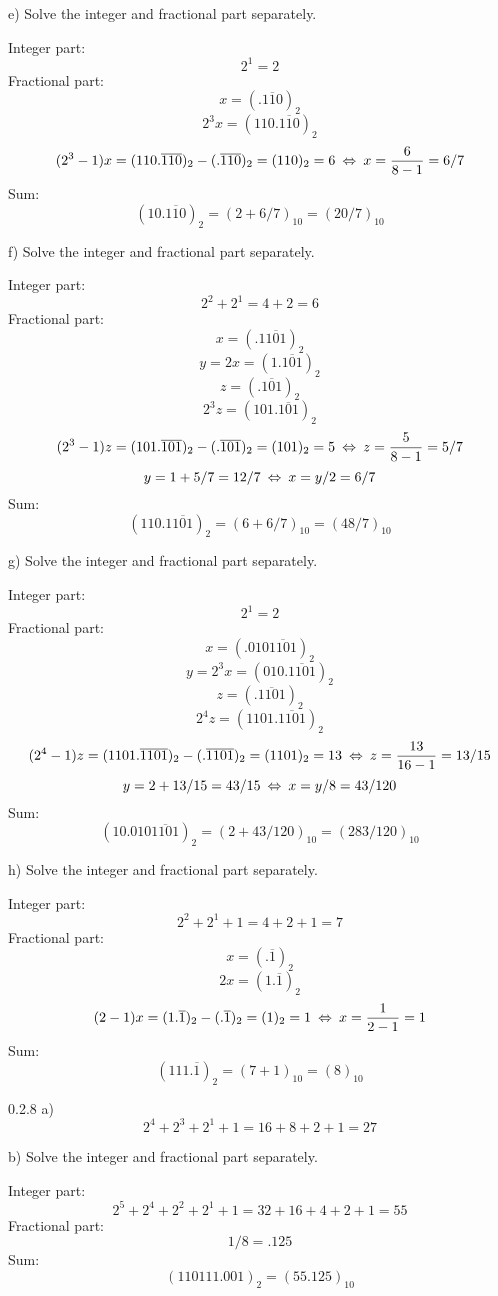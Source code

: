 \begin{task}{e)}
Solve the integer and fractional part separately.

Integer part:
\[2^1=2\]
Fractional part:
\[x=(.\overline{110})_2\]
\[2^3x=(110.\overline{110})_2\]
\[(2^3-1)x=(110.\overline{110})_2-(.\overline{110})_2=(110)_2=6\lra 
x= \dfrac{6}{8-1}=6/7\]
Sum:
\[(10.\overline{110})_2=(2+6/7)_{10}=(20/7)_{10}\]
\end{task}

\begin{task}{f)}
Solve the integer and fractional part separately.

Integer part:
\[2^2+2^1=4+2=6\]
Fractional part:
\[x=(.1\overline{101})_2\]
\[y=2x=(1.\overline{101})_2\]
\[z=(.\overline{101})_2\]
\[2^3z=(101.\overline{101})_2\]
\[(2^3-1)z=(101.\overline{101})_2-(.\overline{101})_2=(101)_2=5\lra 
z= \dfrac{5}{8-1}=5/7\]
\[y=1+5/7=12/7\lra x = y/2 = 6/7\]
Sum:
\[(110.1\overline{101})_2=(6+6/7)_{10}=(48/7)_{10}\]
\end{task}

\begin{task}{g)}
Solve the integer and fractional part separately.

Integer part:
\[2^1=2\]
Fractional part:
\[x=(.010\overline{1101})_2\]
\[y=2^3x=(010.\overline{1101})_2\]
\[z=(.\overline{1101})_2\]
\[2^4z=(1101.\overline{1101})_2\]
\[(2^4-1)z=(1101.\overline{1101})_2-(.\overline{1101})_2=(1101)_2=13\lra 
z= \dfrac{13}{16-1}=13/15\]
\[y=2+13/15=43/15\lra x = y/8 = 43/120\]
Sum:
\[(10.010\overline{1101})_2=(2+43/120)_{10}=(283/120)_{10}\]
\end{task}

\begin{task}{h)}
Solve the integer and fractional part separately.

Integer part:
\[2^2+2^1+1=4+2+1=7\]
Fractional part:
\[x=(.\overline{1})_2\]
\[2x=(1.\overline{1})_2\]
\[(2-1)x=(1.\overline{1})_2-(.\overline{1})_2=(1)_2=1\lra 
x= \dfrac{1}{2-1}=1\]
Sum:
\[(111.\overline{1})_2=(7+1)_{10}=(8)_{10}\]
\end{task}

\begin{task}{0.2.8 a)}
\[2^4+2^3+2^1+1=16+8+2+1=27\]
\end{task}

\begin{task}{b)}
Solve the integer and fractional part separately.

Integer part:
\[2^5+2^4+2^2+2^1+1=32+16+4+2+1=55\]
Fractional part:
\[1/8=.125\]
Sum:
\[(110111.001)_2=(55.125)_{10}\]
\end{task}

